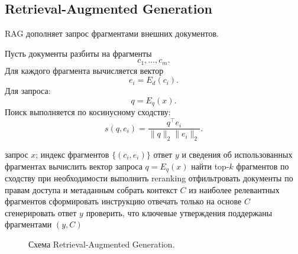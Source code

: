 \documentclass[12pt,a4paper]{article}
\newcommand{\1}{\mathbf{1}}
\theoremstyle{definition}
\theoremstyle{remark}
\begin{document}
\subsection{Retrieval-Augmented Generation}

RAG дополняет запрос фрагментами внешних документов.

Пусть документы разбиты на фрагменты
\[
c_1,\ldots,c_m.
\]
Для каждого фрагмента вычисляется вектор
\[
e_i=E_d(c_i).
\]
Для запроса:
\[
q=E_q(x).
\]
Поиск выполняется по косинусному сходству:
\[
s(q,e_i)
=
\frac{q^\top e_i}
{\|q\|_2\|e_i\|_2}.
\]

\begin{algorithm}[h]
\caption{Базовый RAG-конвейер}
\begin{algorithmic}[1]
\Require запрос $x$; индекс фрагментов $\{(c_i,e_i)\}$
\Ensure ответ $y$ и сведения об использованных фрагментах
\State вычислить вектор запроса $q=E_q(x)$
\State найти top-$k$ фрагментов по сходству
\State при необходимости выполнить reranking
\State отфильтровать документы по правам доступа и метаданным
\State собрать контекст $C$ из наиболее релевантных фрагментов
\State сформировать инструкцию отвечать только на основе $C$
\State сгенерировать ответ $y$
\State проверить, что ключевые утверждения поддержаны фрагментами
\State \Return $(y,C)$
\end{algorithmic}
\end{algorithm}

\begin{figure}[h]
\centering
{}
\caption{Схема Retrieval-Augmented Generation.}
\end{figure}
\end{document}
